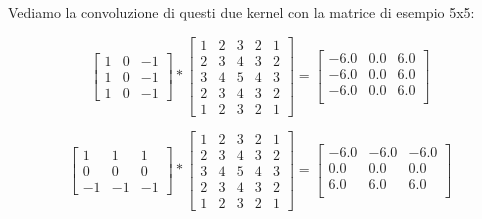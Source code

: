 \hspace{0cm}
Vediamo la convoluzione di questi due kernel con la matrice di esempio 5x5:

\hspace{0cm}
\begin{equation}
    \label{eq:convolution_example}
    \begin{bmatrix}
        1 & 0 & -1 \\
        1 & 0 & -1 \\
        1 & 0 & -1
    \end{bmatrix} *
    \begin{bmatrix}
        1 & 2 & 3 & 2 & 1 \\
        2 & 3 & 4 & 3 & 2 \\
        3 & 4 & 5 & 4 & 3 \\
        2 & 3 & 4 & 3 & 2 \\
        1 & 2 & 3 & 2 & 1
    \end{bmatrix} =
    \begin{bmatrix}
        -6.0 & 0.0 & 6.0 \\
        -6.0 & 0.0 & 6.0 \\
        -6.0 & 0.0 & 6.0 \\
    \end{bmatrix}
\end{equation}

\begin{equation}
    \label{eq:convolution_example_2}
    \begin{bmatrix}
        1 & 1 & 1 \\
        0 & 0 & 0 \\
        -1 & -1 & -1
    \end{bmatrix} *
    \begin{bmatrix}
        1 & 2 & 3 & 2 & 1 \\
        2 & 3 & 4 & 3 & 2 \\
        3 & 4 & 5 & 4 & 3 \\
        2 & 3 & 4 & 3 & 2 \\
        1 & 2 & 3 & 2 & 1
    \end{bmatrix} =
    \begin{bmatrix}
        -6.0 & -6.0 & -6.0 \\
        0.0 & 0.0 & 0.0 \\
        6.0 & 6.0 & 6.0 \\
    \end{bmatrix}
\end{equation}

